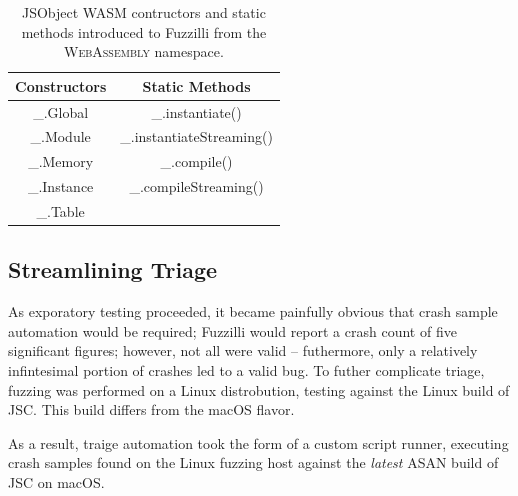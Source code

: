 \begin{table}[h]
  \begin{center}
    \begin{tabular}{c c}
        \toprule
        {Constructors} & {Static Methods} \\ 
        \midrule
        \_.Global   & \_.instantiate() \\
        \_.Module   & \_.instantiateStreaming() \\
        \_.Memory   & \_.compile() \\
        \_.Instance & \_.compileStreaming() \\
        \_.Table    &  \\ [1ex]
        \bottomrule
    \end{tabular}
    \caption{JSObject WASM contructors and static methods introduced to Fuzzilli from the \textsc{WebAssembly} namespace.}
  \end{center}
\end{table}

\subsection{Streamlining Triage} As exporatory testing proceeded, it became painfully obvious that crash sample automation
would be required; Fuzzilli would report a crash count of five significant figures; however, not all were valid -- futhermore,
only a relatively infintesimal portion of crashes led to a valid bug. To futher complicate triage, fuzzing was performed
on a Linux distrobution, testing against the Linux build of JSC. This build differs from the macOS flavor. 

As a result, traige automation took the form of a custom script runner, executing crash samples found on the Linux fuzzing
host against the \textit{latest} ASAN build of JSC on macOS.

